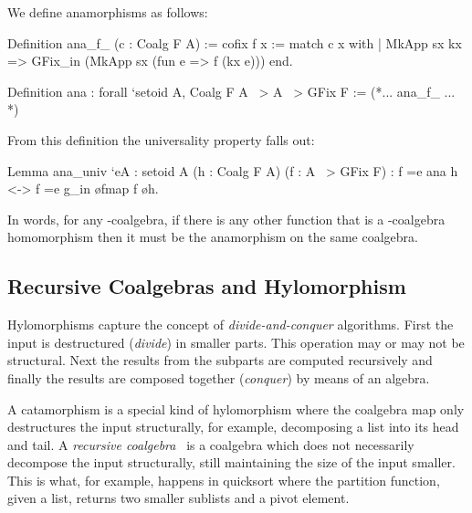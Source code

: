 \documentclass[ a4paper, UKenglish, cleveref, autoref, thm-restate]{lipics-v2021}
\begin{document}
We define anamorphisms as follows:
\begin{coqcode}
Definition ana_f_ (c : Coalg F A) :=
  cofix f x := 
    match c x with | MkApp sx kx => GFix_in (MkApp sx (fun e => f (kx e))) end.

Definition ana : forall `{setoid A}, Coalg F A ~> A ~> GFix F := (*... ana_f_ ... *)
\end{coqcode}
From this definition the universality property falls out:
\begin{coqcode}
Lemma ana_univ `{eA : setoid A} (h : Coalg F A) (f : A ~> GFix F)
: f =e ana h <-> f =e g_in \o fmap f \o h.
\end{coqcode}
In words, for any -coalgebra, if there is any other function 
that is a -coalgebra homomorphism then it must be the anamorphism on the
same coalgebra.

\subsection{Recursive Coalgebras and Hylomorphism}
\label{sec:rec-coalgebras}
Hylomorphisms capture the concept of \emph{divide-and-conquer} algorithms.
First the input is destructured (\emph{divide}) in smaller parts. This
operation may or may not be structural. Next the results from the subparts are
computed recursively and finally the results are composed together
(\emph{conquer}) by means of an algebra.

A catamorphism is a special kind of hylomorphism where the coalgebra
map  only destructures the input structurally, for example,
decomposing a list into its head and tail. A \emph{recursive
coalgebra}~\cite{AdamekMM19,CaprettaUV04} is a coalgebra which does not
necessarily decompose the input structurally, still maintaining the size of the
input smaller. This is what, for example, happens in quicksort where the
partition function, given a list, returns two smaller sublists and a pivot
element.
\end{document}
